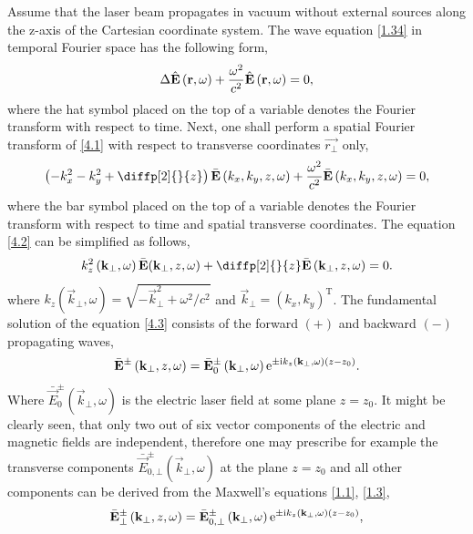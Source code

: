 Assume that the laser beam propagates in vacuum without external sources along the z-axis of the Cartesian coordinate system. The wave equation \ref{1.34} in temporal Fourier space has the following form,
\begin{equation}
\label{4.1}
\Delta \hat{\mathbf{E}} \left(\mathbf{r}, \omega \right) + \frac{\omega^2}{c^2} \hat{\mathbf{E}} \left(\mathbf{r}, \omega \right) = 0,
\end{equation}
where the hat symbol placed on the top of a variable denotes the Fourier transform with respect to time. Next, one shall perform a spatial Fourier transform of \ref{4.1} with respect to transverse coordinates $ \vec{r_\bot} $ only,
\begin{equation}
\label{4.2}
\left(- k^2_x - k^2_y + \diffp[2]{}{z} \right) \bar{\vec{E}} \left(k_x, k_y, z, \omega \right) + \frac{\omega^2}{c^2} \bar{\vec{E}} \left(k_x, k_y, z, \omega \right) = 0,
\end{equation}
where the bar symbol placed on the top of a variable denotes the Fourier transform with respect to time and spatial transverse coordinates. The equation \ref{4.2} can be simplified as follows,
\begin{equation}
\label{4.3}
k^2_z \left(\vec{k}_\bot, \omega \right) \bar{\vec{E}}(\vec{k}_\bot, z, \omega) + \diffp[2]{}{z} \bar{\vec{E}} \left(\vec{k}_\bot, z, \omega \right) = 0.
\end{equation}
where $ k_z \left(\vec{k}_\bot, \omega \right) = \sqrt{-\vec{k}_\bot^2 + \omega^2/c^2} $ and $ \vec{k}_\bot = (k_x, k_y)^{\mathrm{T}} $. The fundamental solution of the equation \ref{4.3} consists of the forward $ (+) $ and backward $ (-) $ propagating waves,
\begin{equation}
\label{4.4}
\bar{\mathbf{E}}^{\pm} \left(\mathbf{k}_\bot, z, \omega \right) = \bar{\mathbf{E}}_{0}^{\pm} \left(\mathbf{k}_\bot, \omega \right) \mathrm{e}^{\pm \mathrm{i} k_z \left(\mathbf{k}_\bot, \omega \right) \left(z - z_0 \right)}.
\end{equation}
Where $ \bar{\vec{E}}_{0}^{\pm}\left(\vec{k}_\bot, \omega \right) $ is the electric laser field at some plane $ z = z_0 $. It might be clearly seen, that only two out of six vector components of the electric and magnetic fields are independent, therefore one may prescribe for example the transverse components $ \bar{\vec{E}}_{0, \bot}^{\pm}\left(\vec{k}_\bot, \omega \right) $ at the plane $ z = z_0 $ and all other components can be derived from the Maxwell's equations \ref{1.1}, \ref{1.3},
\begin{equation}
\label{4.5}
\bar{\mathbf{E}}^{\pm}_{\bot} \left(\mathbf{k}_\bot, z, \omega \right) = \bar{\mathbf{E}}^{\pm}_{0, \bot} \left(\mathbf{k}_\bot, \omega \right) \mathrm{e}^{\pm \mathrm{i} k_z \left(\mathbf{k}_\bot, \omega \right) \left(z - z_0 \right)},
\end{equation}
